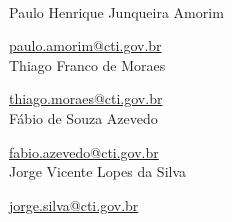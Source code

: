 \scalebox{2.0}{\sffamily Autores do Manual}
\\

Paulo Henrique Junqueira Amorim

\href{mailto:paulo.amorim@cti.gov.br}{paulo.amorim@cti.gov.br}
\\


Thiago Franco de Moraes


\href{mailto:thiago.moraes@cti.gov.br}{thiago.moraes@cti.gov.br}
\\

Fábio de Souza Azevedo


\href{mailto:fabio.azevedo@cti.gov.br}{fabio.azevedo@cti.gov.br}
\\


Jorge Vicente Lopes da Silva


\href{mailto:jorge.silva@cti.gov.br}{jorge.silva@cti.gov.br}
\\
